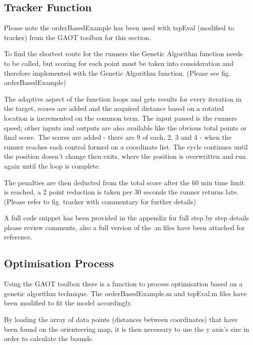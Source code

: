 \documentclass[a4paper, 10pt]{IEEEconf}
\begin{document}

\subsection{Tracker Function}

Please note the orderBasedExample has been used with tspEval (modified to tracker) from the GAOT toolbox for this section.

To find the shortest route for the runners the Genetic Algorithm function needs to be called, but scoring for each point must be taken into consideration and therefore implemented with the Genetic Algorithm function. (Please see fig. orderBasedExample)

The adaptive aspect of the function loops and gets results for every iteration in the target, scores are added and the acquired distance based on a rotated location is incremented on the common term. The input passed is the runners speed; other inputs and outputs are also available like the obvious total points or final score. The scores are added - there are 9 of each, 2, 3 and 4 - when the runner reaches each control formed on a coordinate list. The cycle continues until the position doesn't change then exits, where the position is overwritten and run again until the loop is complete.

The penalties are then deducted from the total score after the 60 min time limit is reached, a 2 point reduction is taken per 30 seconds the runner returns late. (Please refer to fig. tracker with commentary for further details)

A full code snippet has been provided in the appendix for full step by step details please review comments, also a full version of the .m files have been attached for reference.

\clearpage
\subsection{Optimisation Process}
Using the GAOT toolbox there is a function to process optimisation based on a genetic algorithm technique. The orderBasedExample.m and tspEval.m files have been modified to fit the model accordingly. 

By loading the array of data points (distances between coordinates) that have been found on the orienteering map, it is then necessary to use the y axis's size in order to calculate the bounds. 
\end{document}

